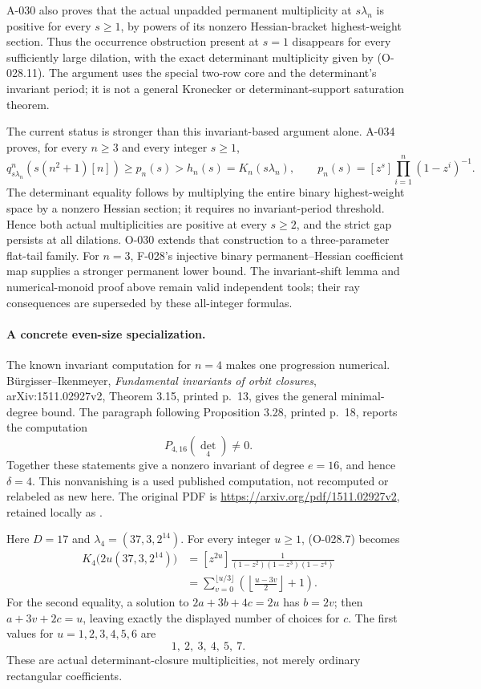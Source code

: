 A-030 also proves that the actual unpadded permanent
multiplicity at \(s\lambda_n\) is positive for every \(s\geq1\),
by powers of its nonzero Hessian-bracket highest-weight section.
Thus the occurrence obstruction present at \(s=1\) disappears
for every sufficiently large dilation, with the exact
determinant multiplicity given by (O-028.11).
The argument uses the special two-row core and the
determinant's invariant period; it is not a general
Kronecker or determinant-support saturation theorem.

The current status is stronger than this invariant-based
argument alone. A-034 proves, for every \(n\geq3\) and
every integer \(s\geq1\),
\[
 q^n_{s\lambda_n}(s(n^2+1)[n])
       \geq p_n(s)>h_n(s)=K_n(s\lambda_n),
 \qquad
 p_n(s)=[z^s]\prod_{i=1}^{n}(1-z^i)^{-1}.
\]
The determinant equality follows by multiplying the
entire binary highest-weight space by a nonzero
Hessian section; it requires no invariant-period
threshold. Hence both actual multiplicities are
positive at every \(s\geq2\), and the strict gap
persists at all dilations. O-030 extends that
construction to a three-parameter flat-tail family.
For \(n=3\), F-028's injective binary
permanent--Hessian coefficient map supplies a stronger
permanent lower bound. The invariant-shift lemma and
numerical-monoid proof above remain valid independent
tools; their ray consequences are superseded by these
all-integer formulas.

\paragraph{A concrete even-size specialization.}
The known invariant computation for \(n=4\) makes one
progression numerical.
B\"urgisser--Ikenmeyer, \emph{Fundamental invariants of orbit
closures}, arXiv:1511.02927v2, Theorem 3.15,
printed p.~13, gives the general minimal-degree bound.
The paragraph following Proposition 3.28, printed p.~18,
reports the computation
\[
                            P_{4,16}(\det_4)\ne0.
\]
Together these statements give a nonzero invariant of
degree \(e=16\), and hence \(\delta=4\).
This nonvanishing is a used published computation, not
recomputed or relabeled as new here.
The original PDF is
\url{https://arxiv.org/pdf/1511.02927v2}, retained locally
as .

Here \(D=17\) and
\(\lambda_4=(37,3,2^{14})\).
For every integer \(u\geq1\), (O-028.7) becomes
\[
 \begin{split}
 K_4\bigl(2u(37,3,2^{14})\bigr)
   &=[z^{2u}]\frac1{(1-z^2)(1-z^3)(1-z^4)}\\
   &=\sum_{v=0}^{\lfloor u/3\rfloor}
                    \left(\left\lfloor\frac{u-3v}{2}\right\rfloor+1\right).
 \end{split}                                                   \tag{O-028.10}
\]
For the second equality, a solution to
\(2a+3b+4c=2u\) has \(b=2v\);
then \(a+3v+2c=u\), leaving exactly the displayed
number of choices for \(c\).
The first values for \(u=1,2,3,4,5,6\) are
\[
                              1,\ 2,\ 3,\ 4,\ 5,\ 7.
\]
These are actual determinant-closure multiplicities,
not merely ordinary rectangular coefficients.


